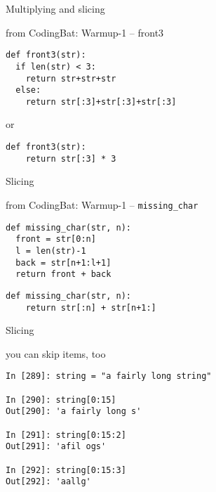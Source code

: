 \documentclass{beamer}
\begin{document}
\begin{frame}[fragile]{Multiplying and slicing}

{\Large from CodingBat: Warmup-1 -- front3}

\begin{verbatim}
def front3(str):
  if len(str) < 3:
    return str+str+str
  else:
    return str[:3]+str[:3]+str[:3]
\end{verbatim}

{\Large or}

\begin{verbatim}
def front3(str):
    return str[:3] * 3
\end{verbatim}

\end{frame} 

\begin{frame}[fragile]{Slicing}

{\Large from CodingBat: Warmup-1 -- \verb+missing_char+ }

\begin{verbatim}
def missing_char(str, n):
  front = str[0:n]
  l = len(str)-1
  back = str[n+1:l+1]
  return front + back
\end{verbatim}

\begin{verbatim}
def missing_char(str, n):
    return str[:n] + str[n+1:]
\end{verbatim}

\end{frame} 

\begin{frame}[fragile]{Slicing}

{\Large you can skip items, too}

\begin{verbatim}
In [289]: string = "a fairly long string"

In [290]: string[0:15]
Out[290]: 'a fairly long s'

In [291]: string[0:15:2]
Out[291]: 'afil ogs'

In [292]: string[0:15:3]
Out[292]: 'aallg'
\end{verbatim}

\end{frame} 
\end{document}
